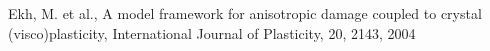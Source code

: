 \documentclass[11pt,a4paper]{article}
\begin{document}

\begin{thebibliography}{99}


Ekh, M.  et al.,
A model framework for anisotropic damage coupled to crystal (visco)plasticity,
International Journal of Plasticity,
20,
2143,
2004
%


\end{thebibliography}
\end{document}
